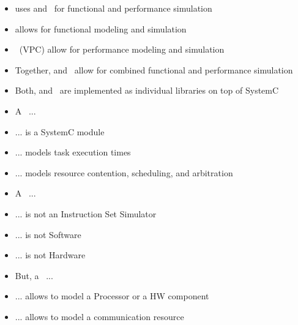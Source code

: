 \begin{frame}[t]
\begin{itemize}
\item \SystemCoDesigner{} uses \SysteMoC{} and \VPCs\ for functional and performance simulation
\end{itemize}
\begin{itemize}
\item \SysteMoC{} allows for functional modeling and simulation
\end{itemize}

\begin{itemize}
\item \VPCs\ (VPC) allow for performance modeling and simulation
\end{itemize}

\begin{itemize}
\item Together, \SysteMoC{} and \VPCs\, allow for combined functional and performance simulation
\end{itemize}

\begin{itemize}
\item Both, \SysteMoC{} and \VPCs\, are implemented as individual libraries on top of SystemC
\end{itemize}

\end{frame}


\begin{frame}[t]
\begin{itemize}
\item A \VPC\ ...
\item ... is a SystemC module
\item ... models task execution times
\item ... models resource contention, scheduling, and arbitration
\end{itemize}

\begin{itemize}
\item A \VPC\ ...
\item ... is not an Instruction Set Simulator
\item ... is not Software
\item ... is not Hardware
\end{itemize}

\begin{itemize}
\item But, a \VPC\ ...
\item ... allows to model a Processor or a HW component
\item ... allows to model a communication resource
\end{itemize}

\end{frame}



